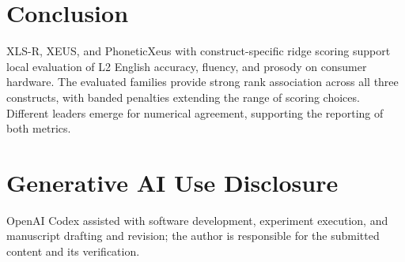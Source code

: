 \documentclass[10pt]{article}
\begin{document}
\section{Conclusion}
XLS-R, XEUS, and PhoneticXeus with construct-specific ridge scoring support local evaluation of L2 English accuracy, fluency, and prosody on consumer hardware. The evaluated families provide strong rank association across all three constructs, with banded penalties extending the range of scoring choices. Different leaders emerge for numerical agreement, supporting the reporting of both metrics.

\section{Generative AI Use Disclosure}
OpenAI Codex assisted with software development, experiment execution, and manuscript drafting and revision; the author is responsible for the submitted content and its verification.
\end{document}
